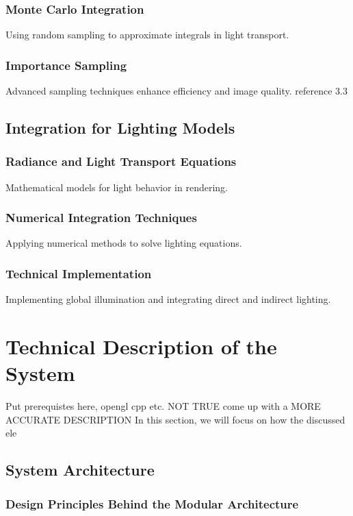 \documentclass[12pt]{article}
\begin{document}
\subsubsection{Monte Carlo Integration}
Using random sampling to approximate integrals in light transport.

\subsubsection{Importance Sampling}
Advanced sampling techniques enhance efficiency and image quality.
reference 3.3
\subsection{Integration for Lighting Models}
\subsubsection{Radiance and Light Transport Equations}
Mathematical models for light behavior in rendering.

\subsubsection{Numerical Integration Techniques}
Applying numerical methods to solve lighting equations.

\subsubsection{Technical Implementation}
Implementing global illumination and integrating direct and indirect lighting.

\section{Technical Description of the System}
\label{sec:system-description}

Put prerequistes here, opengl cpp etc.
NOT TRUE come up with a MORE ACCURATE DESCRIPTION
In this section, we will focus on how the discussed ele

\subsection{System Architecture}

\subsubsection{Design Principles Behind the Modular Architecture}
\end{document}
